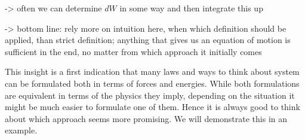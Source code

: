 \documentclass[../class_mech_main.tex]{subfiles}
\begin{document}
\begin{itemize}
	-> often we can determine $dW$ in some way and then integrate this up

	-> bottom line: rely more on intuition here, when which definition should be applied, than strict definition; anything that gives us an equation of motion is sufficient in the end, no matter from which approach it initially comes
\end{itemize}


This insight is a first indication that many laws and ways to think about system can be formulated both in terms of forces and energies. While both formulations are equivalent in terms of the physics they imply, depending on the situation it might be much easier to formulate one of them. Hence it is always good to think about which approach seems more promising. We will demonstrate this in an example.
\end{document}
